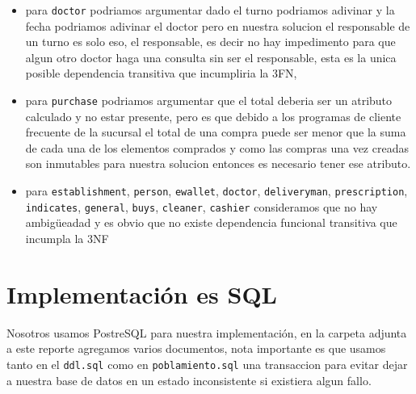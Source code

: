 \documentclass[12pt, fleqn]{report}                             %
\theoremstyle{break}                                            %
\begin{document}
\begin{itemize}
                \item para \texttt{doctor} podriamos argumentar dado el turno podriamos adivinar y la fecha podriamos adivinar el doctor pero
                en nuestra solucion el responsable de un turno es solo eso, el responsable, es decir no hay impedimento para que algun otro doctor 
                haga una consulta sin ser el responsable, esta es la unica posible dependencia transitiva que incumpliria la 3FN, 

                \item para \texttt{purchase} podriamos argumentar que el total deberia ser un atributo calculado y no estar presente, pero es que debido
                a los programas de cliente frecuente de la sucursal el total de una compra puede ser menor que la suma de cada una de los elementos comprados
                y como las compras una vez creadas son inmutables para nuestra solucion entonces es necesario tener ese atributo.

                
                \item para \texttt{establishment}, 
                \texttt{person},
                \texttt{ewallet},
                \texttt{doctor},
                \texttt{deliveryman},
                \texttt{prescription},
                \texttt{indicates},
                \texttt{general},
                \texttt{buys},
                \texttt{cleaner},
                \texttt{cashier}
                consideramos que no hay ambigüeadad y es obvio que no existe dependencia funcional transitiva que incumpla la 3NF
            \end{itemize}


    \chapter{Implementación es SQL}

        Nosotros usamos PostreSQL para nuestra implementación, en la carpeta adjunta a este reporte agregamos varios documentos, nota
        importante es que usamos tanto en el \texttt{ddl.sql} como en \texttt{poblamiento.sql} una transaccion para evitar dejar a nuestra base
        de datos en un estado inconsistente si existiera algun fallo.
\end{document}
